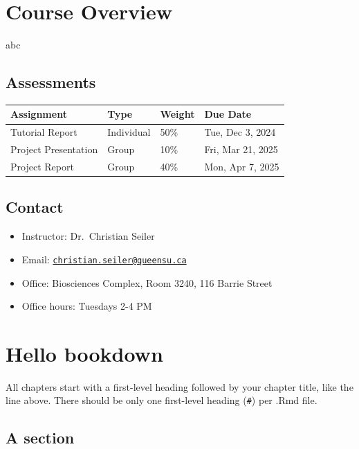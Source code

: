 \documentclass[
]{book}
\author{}
\date{\vspace{-2.5em}}
\providecommand{\tightlist}{%
  \setlength{\itemsep}{0pt}\setlength{\parskip}{0pt}}
\begin{document}
{
\setcounter{tocdepth}{1}
\tableofcontents
}
\chapter{Course Overview}\label{course-overview}

abc

\section{Assessments}\label{assessments}

\begin{longtable}[]{@{}llll@{}}
\toprule\noalign{}
Assignment & Type & Weight & Due Date \\
\midrule\noalign{}
\endhead
\bottomrule\noalign{}
\endlastfoot
Tutorial Report & Individual & 50\% & Tue, Dec 3, 2024 \\
Project Presentation & Group & 10\% & Fri, Mar 21, 2025 \\
Project Report & Group & 40\% & Mon, Apr 7, 2025 \\
\end{longtable}

\section{Contact}\label{contact}

\begin{itemize}
\tightlist
\item
  Instructor: Dr.~Christian Seiler
\item
  Email: \href{mailto:christian.seiler@queensu.ca}{\nolinkurl{christian.seiler@queensu.ca}}
\item
  Office: Biosciences Complex, Room 3240, 116 Barrie Street
\item
  Office hours: Tuesdays 2-4 PM
\end{itemize}

\chapter{Hello bookdown}\label{hello-bookdown}

All chapters start with a first-level heading followed by your chapter title, like the line above. There should be only one first-level heading (\texttt{\#}) per .Rmd file.

\section{A section}\label{a-section}
\end{document}
